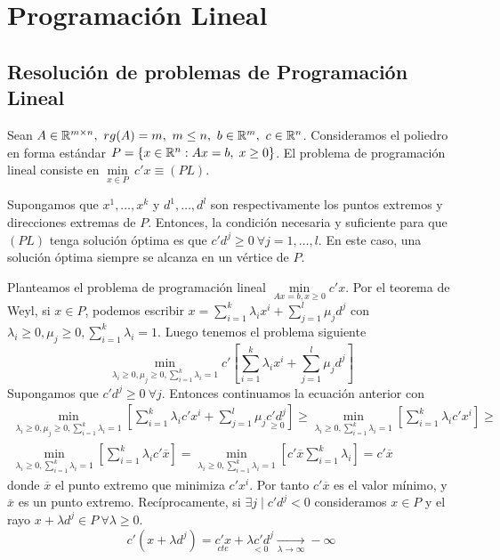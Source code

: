 \documentclass[PM.tex]{subfiles}
\begin{document}
\chapter{Programación Lineal}

\section{Resolución de problemas de Programación Lineal}

Sean $A\in\mathbb{R}^{m\times n},\ rg(A)=m,\ m\leq n,\ b\in\mathbb{R}^m,\ c\in\mathbb{R}^n$. Consideramos el poliedro en forma estándar $P=\{x\in\mathbb{R}^n: Ax=b,\;x\geq 0\}$. El problema de programación lineal consiste en $\underset{x\in P}{\min}\ c'x \equiv (PL)$. 

\begin{theorem} Supongamos que $x^1,\dots ,x^k$ y $d^1,\dots ,d^l$ son respectivamente los puntos extremos y direcciones extremas de $P$. Entonces, la condición necesaria y suficiente para que $(PL)$ tenga solución óptima es que $c'd^j\geq 0\ \forall j=1,\dots, l$. En este caso, una solución óptima siempre se alcanza en un vértice de $P$.
\end{theorem}
\begin{dem}
Planteamos el problema de programación lineal $\underset{Ax=b,x\geq 0}{\min} c'x$. Por el teorema de Weyl, si $x\in P$, podemos escribir $x=\sum_{i=1}^k\lambda_ix^i +\sum_{j=1}^l\mu_j d^j$ con $\lambda_i\geq 0, \mu_j\geq 0, \sum_{i=1}^k\lambda_i=1$. Luego tenemos el problema siguiente
\[\underset{\lambda_i\geq 0, \mu_j\geq 0, \sum_{i=1}^k\lambda_i=1}{\min} c'\left[\sum_{i=1}^k\lambda_ix^i +\sum_{j=1}^l\mu_j d^j\right] \]
Supongamos que $c'd^j\geq 0\ \forall j$. Entonces continuamos la ecuación anterior con 
\begin{gather*}
 \underset{\lambda_i\geq 0, \mu_j\geq 0, \sum_{i=1}^k\lambda_i=1}{\min} \left[\sum_{i=1}^k\lambda_ic'x^i +\sum_{j=1}^l\mu_j \underset{\geq 0}{c'd^j}\right]\geq \underset{\lambda_i\geq 0, \sum_{i=1}^k\lambda_i=1}{\min} \left[\sum_{i=1}^k\lambda_ic'x^i\right]\geq \\
\underset{\lambda_i\geq 0, \sum_{i=1}^k\lambda_i=1}{\min} \left[\sum_{i=1}^k\lambda_ic'\overline{x}\right]= \underset{\lambda_i\geq 0, \sum_{i=1}^k\lambda_i=1}{\min} \left[c'\overline{x}\sum_{i=1}^k\lambda_i\right]=c'\overline{x}
\end{gather*}
donde $\overline{x}$ el punto extremo que minimiza $c'x^i$. Por tanto $c'\overline{x}$ es el valor mínimo, y $\overline{x}$ es un punto extremo. Recíprocamente, si $\exists j\mid c'd^j<0$ consideramos $x\in P$ y el rayo $x+\lambda d^j\in P\ \forall\lambda\geq 0$. 
\[ c'(x+\lambda d^j)=\underset{cte}{c'x} + \underset{<0}{\lambda c' d^j}\underset{\lambda\to\infty}{\longrightarrow} -\infty\]
\end{dem}
\end{document}
